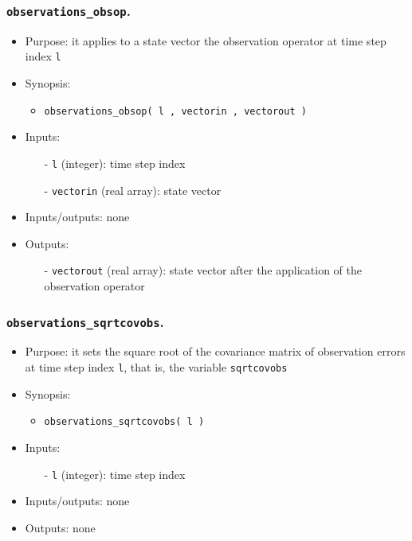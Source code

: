 \documentclass[12pt]{article}
\begin{document}
\subsubsection{{\tt observations\_obsop}.}
\begin{itemize}
\item Purpose: it applies to a state vector the observation operator at time step index {\tt l} 
\item Synopsis: 
\begin{itemize}
\item {\tt observations\_obsop( l , vectorin , vectorout )}
\end{itemize}
\item Inputs: 
\begin{itemize}
\item[-] {\tt l} (integer): time step index
\item[-] {\tt vectorin} (real array): state vector
\end{itemize}
\item Inputs/outputs: none
\item Outputs: 
\begin{itemize}
\item[-] {\tt vectorout} (real array): state vector after the application of the observation operator
\end{itemize}
\end{itemize} 

\subsubsection{{\tt observations\_sqrtcovobs}.}
\begin{itemize}
\item Purpose: it sets the square root of the covariance matrix of observation errors at time step index {\tt l}, that is, the variable {\tt sqrtcovobs}
\item Synopsis: 
\begin{itemize}
\item {\tt observations\_sqrtcovobs( l )}
\end{itemize}
\item Inputs: 
\begin{itemize}
\item[-] {\tt l} (integer): time step index
\end{itemize}
\item Inputs/outputs: none
\item Outputs: none
\end{itemize} 
\end{document}
